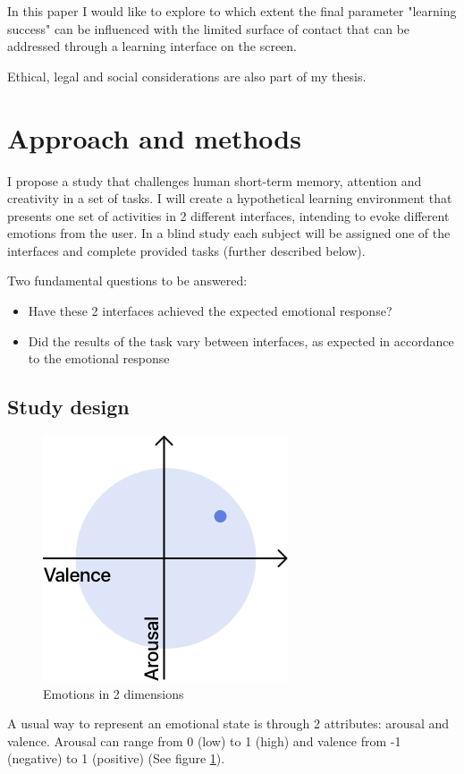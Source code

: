 In this paper I would like to explore to which extent the final parameter "learning success" can be influenced with the limited surface of contact that can be addressed through a learning interface on the screen.

Ethical, legal and social considerations are also part of my thesis.

\section{Approach and methods}

I propose a study that challenges human short-term memory, attention and creativity in a set of tasks. I will create a hypothetical learning environment that presents one set of activities in 2 different interfaces, intending to evoke different emotions from the user. In a blind study each subject will be assigned one of the interfaces and complete provided tasks (further described below).

Two fundamental questions to be answered:
\begin{itemize}
	\item Have these 2 interfaces achieved the expected emotional response?
	\item Did the results of the task vary between interfaces, as expected in accordance to the emotional response
\end{itemize}

\subsection{Study design}

\begin{figure}
	\centering
	\includegraphics[width=0.25\linewidth]{images/valence-arousal.png}
	\caption[Emotions in 2 dimensions]{Emotions in 2 dimensions}
	\label{fig:valence-arousal}
\end{figure}

A usual way to represent an emotional state is through 2 attributes: arousal and valence. Arousal can range from 0 (low) to 1 (high) and valence from -1 (negative) to 1 (positive) (See figure \ref{fig:valence-arousal}). 


